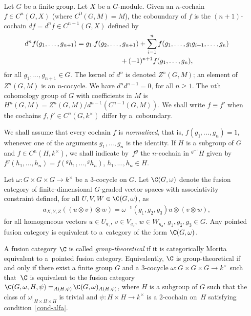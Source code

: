 \subsection{}\label{cgomega} Let $G$ be a f\/inite group.
Let $X$ be a $G$-module. Given an $n$-cochain $f \in C^n(G, X)$ (where $C^0(G, M) = M$), the coboundary of $f$ is the $(n+1)$-cochain $df = d^nf \in C^{n+1}(G, X)$ def\/ined by
\begin{gather*}d^nf(g_1, \dots, g_{n+1}) = g_1.f(g_2, \dots, g_{n+1}) + \sum_{i = 1}^{n}f(g_1, \dots, g_ig_{i+1}, \dots, g_n)\\
 \hphantom{d^nf(g_1, \dots, g_{n+1}) =}{} + (-1)^{n+1} f(g_1, \dots, g_n),\end{gather*}
for all $g_1, \dots, g_{n+1} \in G$. The kernel of $d^n$ is denoted $Z^n(G, M)$; an element of $Z^n(G, M)$ is an $n$-cocycle. We have $d^nd^{n-1} = 0$, for all $n \geq 1$. The $n$th cohomology group of $G$ with coef\/f\/icients in $M$ is $H^n(G, M) = Z^n(G, M)/d^{n-1}(C^{n-1}(G, M))$. We shall write $f \equiv f'$ when the cochains $f, f' \in C^n(G, k^\times)$ dif\/fer by a~coboundary.

We shall assume that every cochain $f$ is \emph{normalized}, that is, $f(g_1, \dots, g_n) = 1$, whenever one of the arguments $g_1, \dots, g_n$ is the identity. If $H$ is a subgroup of $G$ and $f \in C^n(H, k^\times)$, we shall indicate by~$f^g$ the $n$-cochain in $^{g^{-1}\!}H$ given by $f^g(h_1, \dots, h_n) = f({}^g h_1, \dots, {}^g h_n)$, $h_1, \dots, h_n \in H$.

Let $\omega \colon G \times G \times G \to k^\times$ be a 3-cocycle on $G$. Let $\C(G, \omega)$ denote the fusion category of f\/inite-dimensional $G$-graded vector spaces with associativity constraint def\/ined, for all $U, V, W\in \C(G, \omega)$, as
\begin{gather*}a_{X, Y, Z} ((u \otimes v)\otimes w) = \omega^{-1}(g_1, g_2, g_3) u \otimes (v\otimes w),\end{gather*}
for all homogeneous vectors $u \in U_{g_1}$, $v \in V_{g_2}$, $w \in W_{g_3}$, $g_1, g_2, g_3 \in G$. Any pointed fusion category is equivalent to a~category of the form $\C(G, \omega)$.

A fusion category $\C$ is called \emph{group-theoretical} if it is categorically Morita equivalent to a~pointed fusion category. Equivalently, $\C$ is group-theoretical if and only if there exist a f\/inite group $G$ and a $3$-cocycle $\omega\colon G \times G \times G \to k^{\times}$ such that~$\C$ is equivalent to the fusion category $\C(G, \omega, H, \psi) = _{A(H, \psi)\!}\C(G, \omega)_{A(H, \psi)}$, where $H$ is a subgroup of $G$ such that the class of $\omega\vert_{H\times H \times H}$ is trivial and $\psi\colon H \times H \to k^{\times}$ is a 2-cochain on~$H$ satisfying condition~\eqref{cond-alfa}.

